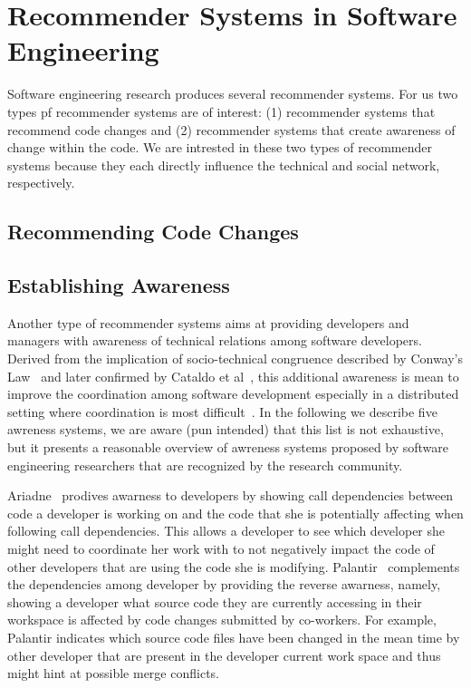 \section{Recommender Systems in Software Engineering}
Software engineering research produces several recommender systems.
For us two types pf recommender systems are of interest:
(1) recommender systems that recommend code changes
and (2) recommender systems that create awareness of change within the code.
We are intrested in these two types of recommender systems because they each directly influence the technical and social network, respectively.

\subsection{Recommending Code Changes}

\subsection{Establishing Awareness}
Another type of recommender systems aims at providing developers and managers with awareness of technical relations among software developers.
Derived from the implication of socio-technical congruence described by Conway's Law~\cite{} and later confirmed by Cataldo et al~\cite{}, this additional awareness is mean to improve the coordination among software development especially in a distributed setting where coordination is most difficult~\cite{}.
In the following we describe five awreness systems, we are aware (pun intended) that this list is not exhaustive, but it presents a reasonable overview of awreness systems proposed by software engineering researchers that are recognized by the research community.

Ariadne~\cite{} prodives awarness to developers by showing call dependencies between code a developer is working on and the code that she is potentially affecting when following call dependencies.
This allows a developer to see which developer she might need to coordinate her work with to not negatively impact the code of other developers that are using the code she is modifying.
%
Palantir~\cite{} complements the dependencies among developer by providing the reverse awarness, namely, showing a developer what source code they are currently accessing in their workspace is affected by code changes submitted by co-workers.
For example, Palantir indicates which source code files have been changed in the mean time by other developer that are present in the developer current work space and thus might hint at possible merge conflicts.

